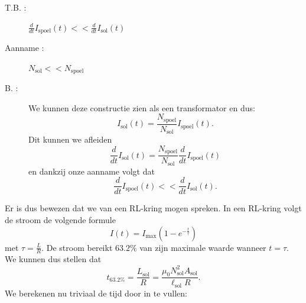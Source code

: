 \begin{enumerate}[(a)]
\begin{description}[labelwidth=1.5cm, leftmargin=!]
                \begin{tcolorbox}
                    \begin{description}
                        \item[T.B. :] $\frac{d}{dt} I_{\text{spoel}}(t) << \frac{d}{dt} I_{\text{sol}}(t)$
                        \item[Aanname :] $N_{\text{sol}} << N_{\text{spoel}}$
                        \item[B. :] 
                            We kunnen deze constructie zien als een transformator en dus:
                            \begin{equation*}
                                I_{\text{sol}}(t) = \frac{N_{\text{spoel}}}{N_{\text{sol}}} I_{\text{spoel}}(t).
                            \end{equation*}
                            Dit kunnen we afleiden
                            \begin{equation*}
                                \frac{d}{dt} I_{\text{sol}}(t) = \frac{N_{\text{spoel}}}{N_{\text{sol}}} \frac{d}{dt} I_{\text{spoel}}(t)
                            \end{equation*}
                            en dankzij onze aanname volgt dat 
                            \begin{equation*}
                                \frac{d}{dt} I_{\text{spoel}}(t) << \frac{d}{dt} I_{\text{sol}}(t).
                            \end{equation*}
                    \end{description}
                \end{tcolorbox}
                Er is dus bewezen dat we van een RL-kring mogen spreken. In een RL-kring volgt de stroom de volgende formule
                \begin{equation*}
                    I(t) = I_{\text{max}} \left( 1 - e^{-\frac{t}{\tau}} \right)
                \end{equation*}
                met $\tau = \frac{L}{R}$. De stroom bereikt $63.2\%$ van zijn maximale waarde wanneer $t = \tau $. We kunnen dus stellen dat
                \begin{equation*}
                    t_{63.2\%} = \frac{L_{{\text{sol}}}}{R} = \frac{\mu_0N_{{\text{sol}}}^2A_{{\text{sol}}}}{\ell_{{\text{sol}}}R}.
                \end{equation*}
                We berekenen nu triviaal de tijd door in te vullen:
                \begin{equation*}

\end{equation*}
\end{description}
\end{enumerate}

